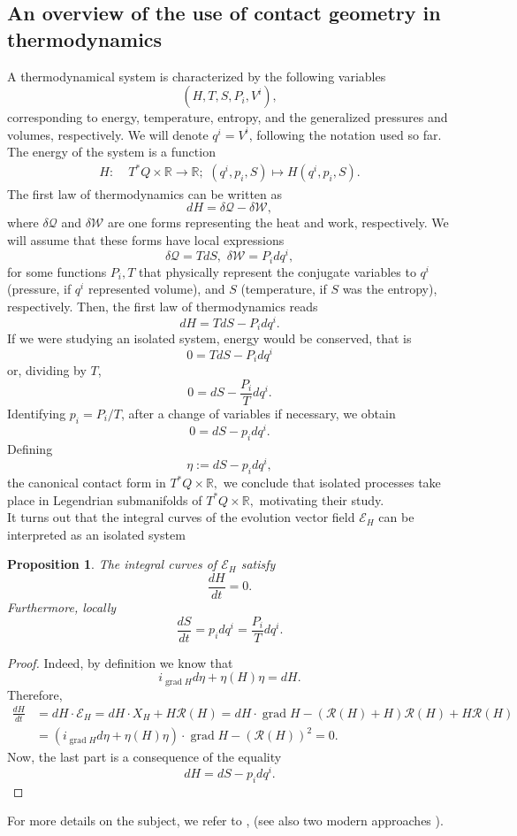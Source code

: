 \documentclass[12pt]{article}
\newtheorem{prop}{Proposition}[section]
\newcommand{\grad}{\operatorname{grad}}
\newcommand{\totder}[2]{\frac{d #1}{d #2}}
\begin{document}
\subsection{An overview of the use of contact geometry in thermodynamics}
A thermodynamical system is characterized by the following variables $$(H, T, S, P_i, V^i),$$ corresponding to energy, temperature, entropy, and 
the generalized pressures and volumes, respectively. We will denote $q^i = V^i$, following the notation used so far. The energy of the system is a function 
\begin{align*}
    H : & \; T^\ast Q \times \mathbb{R} \rightarrow \mathbb{R}; \,\,(q^i, p_i, S) \mapsto H(q^i,p_i, S).
\end{align*}
The first law of thermodynamics can be written as $$d H = \delta \mathcal{Q} - \delta \mathcal{W},$$ where $\delta \mathcal{Q}$ and $\delta \mathcal{W}$ are one forms representing the heat and work, respectively. We will assume that these forms have local expressions 
$$\delta \mathcal{Q} = T dS, \,\, \delta \mathcal{W} = P_i dq^i,$$ 
for some functions $P_i, T$ that physically represent the conjugate variables to $q^i$ (pressure, if $q^i$ represented volume), and $S$ (temperature, if $S$ was the entropy), respectively. Then, the first law of thermodynamics reads $$d H = Td S  - P_i dq^i.$$ If we were studying an isolated system, energy would be conserved, that is $$0 = Td S  - P_i dq^i$$ or, dividing by $T$, $$0 = d S - \frac{P_i}{T} d q^i.$$ Identifying $p_i = P_i/T$, after a change of variables if necessary, we obtain $$0 = dS - p_i dq^i.$$ Defining $$\eta := d S - p_i dq^i,$$ the canonical contact form in $T^\ast Q \times \mathbb{R},$ we conclude that isolated processes take place in Legendrian submanifolds of $T^\ast Q \times \mathbb{R},$ motivating their study.\\

It turns out that the integral curves of the evolution vector field $\mathcal{E}_H$ can be interpreted as an isolated system\\

\begin{prop} The integral curves of $\mathcal{E}_H$ satisfy $$\totder{H}{t} = 0.$$ Furthermore, locally $$\totder{S}{t} = p_i dq ^i = \frac{P_i}{T} d q^i.$$
\end{prop}
\begin{proof} Indeed, by definition we know that $$i_{\grad H} d \eta + \eta(H) \eta = d H.$$ Therefore,
\begin{align*}
    \totder{H}{t} &= d H \cdot  \mathcal{E}_H = d H \cdot X_H + H \mathcal{R}(H) = d H \cdot \grad H - (\mathcal{R}(H) + H) \mathcal{R}(H) + H \mathcal{R}(H)\\
    &=(i_{\grad H} d \eta + \eta(H) \eta)\cdot \grad H - (\mathcal{R}(H))^2  = 0.
\end{align*}
Now, the last part is a consequence of the equality $$d H = d S - p_i dq^i.$$
\end{proof}
For more details on the subject, we refer to \cites{ArnoldThermo, GeometrySomeThermo,simoes2020contact,simoes2021ThermodynamicSystems, MRUGALAcontactstrcuture, MRUGALAcontinuouscontact}, (see also two modern approaches \cites{bravetti1,bravetti2}).
\end{document}

